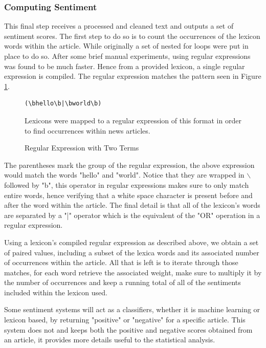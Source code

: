 \subsubsection{Computing Sentiment}

This final step receives a processed and cleaned text and outputs a set of sentiment scores. The first step to do so is to count the occurrences of the lexicon words within the article. While originally a set of nested for loops were put in place to do so. After some brief manual experiments, using regular expressions was found to be much faster. Hence from a provided lexicon, a single regular expression is compiled. The regular expression matches the pattern seen in Figure \ref{fig:regex}.

\begin{figure}[H]
\centering
\begin{BVerbatim}
(\bhello\b|\bworld\b)
\end{BVerbatim}
\caption{Regular Expression with Two Terms}
\label{fig:regex}
Lexicons were mapped to a regular expression of this format in order to find occurrences within news articles.
\end{figure}

The parentheses mark the group of the regular expression, the above expression would match the words "hello" and "world". Notice that they are wrapped in $\backslash$ followed by "b", this operator in regular expressions makes sure to only match entire words, hence verifying that a white space character is present before and after the word within the article. The final detail is that all of the lexicon's words are separated by a "|" operator which is the equivalent of the "OR" operation in a regular expression.

Using a lexicon's compiled regular expression as described above, we obtain a set of paired values, including a subset of the lexica words and its associated number of occurrences within the article.
All that is left is to iterate through those matches, for each word retrieve the associated weight, make sure to multiply it by the number of occurrences and keep a running total of all of the sentiments included within the lexicon used.

Some sentiment systems will act as a classifiers, whether it is machine learning or lexicon based, by returning "positive" or "negative" for a specific article. This system does not and keeps both the positive and negative scores obtained from an article, it provides more details useful to the statistical analysis.

